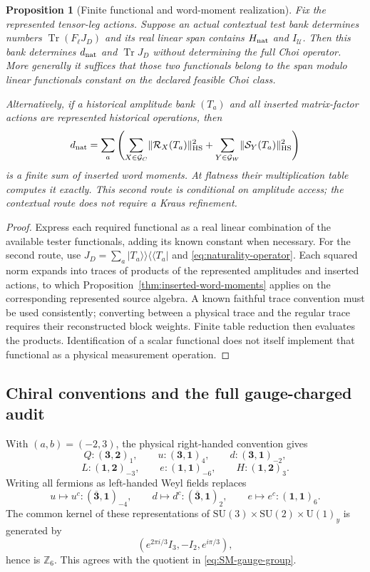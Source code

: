\documentclass[11pt]{article}
\numberwithin{equation}{section}
\newtheorem{proposition}[theorem]{Proposition}
\theoremstyle{definition}
\theoremstyle{remark}
\newcommand{\Z}{\mathbb Z}
\newcommand{\Tr}{\operatorname{Tr}}
\newcommand{\U}{\mathrm U}
\newcommand{\SU}{\mathrm{SU}}
\newcommand{\HS}{\mathrm{HS}}
\newcommand{\norm}[1]{\lVert#1\rVert}
\begin{document}
\begin{proposition}[Finite functional and word-moment realization]
\label{prop:naturality-compilation}
Fix the represented tensor-leg actions.  Suppose an actual contextual test
bank determines numbers $\Tr(F_\ell J_D)$ and its real linear span contains
$H_{\rm nat}$ and $I_{\mathscr U}$.  Then this bank determines
$d_{\rm nat}$ and $\Tr J_D$ without determining the full Choi operator.
More generally it suffices that those two functionals belong to the span
modulo linear functionals constant on the declared feasible Choi class.

Alternatively, if a historical amplitude bank $(T_a)$ and all inserted
matrix-factor actions are represented historical operations, then
\begin{equation}
 d_{\rm nat}
 =\sum_a\left(\sum_{X\in\mathcal G_C}\norm{\mathcal R_X(T_a)}_{\HS}^2
              +\sum_{Y\in\mathcal G_W}\norm{\mathcal S_Y(T_a)}_{\HS}^2\right)
 \label{eq:word-naturality-defect}
\end{equation}
is a finite sum of inserted word moments.  At flatness their multiplication
table computes it exactly.  This second route is conditional on amplitude
access; the contextual route does not require a Kraus refinement.
\end{proposition}

\begin{proof}
Express each required functional as a real linear combination of the
available tester functionals, adding its known constant when necessary.
For the second route, use
$J_D=\sum_a|T_a\rangle\!\rangle\langle\!\langle T_a|$ and
\eqref{eq:naturality-operator}.  Each squared norm expands into traces of
products of the represented amplitudes and inserted actions, to which
Proposition~\ref{thm:inserted-word-moments} applies on the corresponding
represented source algebra.  A known faithful trace convention must be
used consistently; converting between a physical trace and the regular
trace requires their reconstructed block weights.  Finite table reduction
then evaluates the products.  Identification of a scalar functional does
not itself implement that functional as a physical measurement operation.
\end{proof}


\subsection{Chiral conventions and the full gauge-charged audit}

With $(a,b)=(-2,3)$, the physical right-handed convention gives
\[
Q:(\mathbf3,\mathbf2)_1,\qquad
u:(\mathbf3,\mathbf1)_4,\qquad
d:(\mathbf3,\mathbf1)_{-2},
\]
\[
L:(\mathbf1,\mathbf2)_{-3},\qquad
e:(\mathbf1,\mathbf1)_{-6},\qquad
H:(\mathbf1,\mathbf2)_3.
\]
Writing all fermions as left-handed Weyl fields replaces
\[
u\mapsto u^c:(\overline{\mathbf3},\mathbf1)_{-4},
\qquad
d\mapsto d^c:(\overline{\mathbf3},\mathbf1)_2,
\qquad
e\mapsto e^c:(\mathbf1,\mathbf1)_6.
\]
The common kernel of these representations of
$\SU(3)\times\SU(2)\times\U(1)_y$ is generated by
\[
\left(e^{2\pi i/3}I_3,-I_2,e^{i\pi/3}\right),
\]
hence is $\Z_6$.  This agrees with the quotient in
\eqref{eq:SM-gauge-group}.
\end{document}
